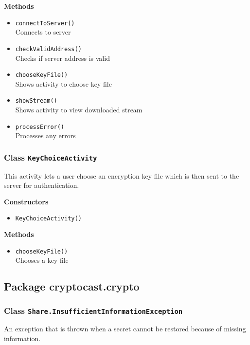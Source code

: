 \textbf{Methods}
\begin{itemize}
\item \lstinline|connectToServer()| \\
Connects to server

\item \lstinline|checkValidAddress()| \\
Checks if server address is valid

\item \lstinline|chooseKeyFile()| \\
Shows activity to choose key file

\item \lstinline|showStream()| \\
Shows activity to view downloaded stream

\item \lstinline|processError()| \\
Processes any errors

\end{itemize}

\subsubsection{Class \lstinline|KeyChoiceActivity|}
This activity lets a user choose an encryption key file 
 which is then sent to the server for authentication.

\textbf{Constructors}
\begin{itemize}
\item \lstinline|KeyChoiceActivity()| \\


\end{itemize}

\textbf{Methods}
\begin{itemize}
\item \lstinline|chooseKeyFile()| \\
Chooses a key file

\end{itemize}


\subsection{Package cryptocast.crypto}
\subsubsection{Class \lstinline|Share.InsufficientInformationException|}
An exception that is thrown when a secret cannot be restored because
 of missing information.

